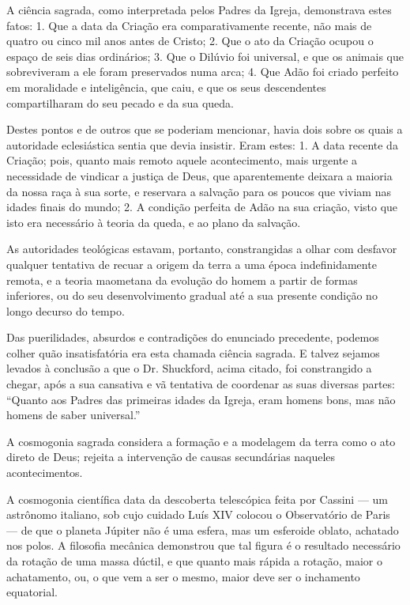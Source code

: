 \documentclass[11pt,a5paper,twoside,openany]{book}
\begin{document}
A ciência sagrada, como interpretada pelos Padres da Igreja, demonstrava estes fatos: 1. Que a data da Criação era comparativamente recente, não mais de quatro ou cinco mil anos antes de Cristo; 2. Que o ato da Criação ocupou o espaço de seis dias ordinários; 3. Que o Dilúvio foi universal, e que os animais que sobreviveram a ele foram preservados numa arca; 4. Que Adão foi criado perfeito em moralidade e inteligência, que caiu, e que os seus descendentes compartilharam do seu pecado e da sua queda.

Destes pontos e de outros que se poderiam mencionar, havia dois sobre os quais a autoridade eclesiástica sentia que devia insistir. Eram estes: 1. A data recente da Criação; pois, quanto mais remoto aquele acontecimento, mais urgente a necessidade de vindicar a justiça de Deus, que aparentemente deixara a maioria da nossa raça à sua sorte, e reservara a salvação para os poucos que viviam nas idades finais do mundo; 2. A condição perfeita de Adão na sua criação, visto que isto era necessário à teoria da queda, e ao plano da salvação.

As autoridades teológicas estavam, portanto, constrangidas a olhar com desfavor qualquer tentativa de recuar a origem da terra a uma época indefinidamente remota, e a teoria maometana da evolução do homem a partir de formas inferiores, ou do seu desenvolvimento gradual até a sua presente condição no longo decurso do tempo.

Das puerilidades, absurdos e contradições do enunciado precedente, podemos colher quão insatisfatória era esta chamada ciência sagrada. E talvez sejamos levados à conclusão a que o Dr. Shuckford, acima citado, foi constrangido a chegar, após a sua cansativa e vã tentativa de coordenar as suas diversas partes: “Quanto aos Padres das primeiras idades da Igreja, eram homens bons, mas não homens de saber universal.”

A cosmogonia sagrada considera a formação e a modelagem da terra como o ato direto de Deus; rejeita a intervenção de causas secundárias naqueles acontecimentos.

A cosmogonia científica data da descoberta telescópica feita por Cassini — um astrônomo italiano, sob cujo cuidado Luís XIV colocou o Observatório de Paris — de que o planeta Júpiter não é uma esfera, mas um esferoide oblato, achatado nos polos. A filosofia mecânica demonstrou que tal figura é o resultado necessário da rotação de uma massa dúctil, e que quanto mais rápida a rotação, maior o achatamento, ou, o que vem a ser o mesmo, maior deve ser o inchamento equatorial.
\end{document}
